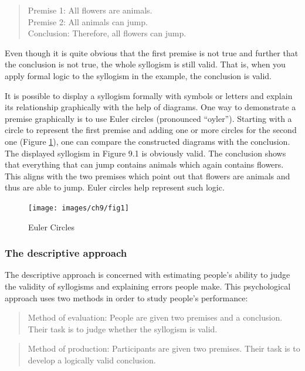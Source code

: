 \documentclass[
]{krantz}
\begin{document}
\begin{quote}
Premise 1: All flowers are animals.\\
Premise 2: All animals can jump.\\
Conclusion: Therefore, all flowers can jump.
\end{quote}

Even though it is quite obvious that the first premise is not true and further that the conclusion is not true, the whole syllogism is still valid. That is, when you apply formal logic to the syllogism in the example, the conclusion is valid.

It is possible to display a syllogism formally with symbols or letters and explain its relationship graphically with the help of diagrams. One way to demonstrate a premise graphically is to use Euler circles (pronounced ``oyler''). Starting with a circle to represent the first premise and adding one or more circles for the second one (Figure \ref{fig:euler}), one can compare the constructed diagrams with the conclusion. The displayed syllogism in Figure 9.1 is obviously valid. The conclusion shows that everything that can jump contains animals which again contains flowers. This aligns with the two premises which point out that flowers are animals and thus are able to jump. Euler circles help represent such logic.

\begin{figure}

{\centering \texttt{[image: images/ch9/fig1]} 

}

\caption{Euler Circles}\label{fig:euler}
\end{figure}

\subsubsection*{The descriptive approach}\label{the-descriptive-approach}


The descriptive approach is concerned with estimating people's ability to judge the validity of syllogisms and explaining errors people make. This psychological approach uses two methods in order to study people's performance:

\begin{quote}
Method of evaluation: People are given two premises and a conclusion. Their task is to judge whether the syllogism is valid.
\end{quote}

\begin{quote}
Method of production: Participants are given two premises. Their task is to develop a logically valid conclusion.
\end{quote}
\end{document}
